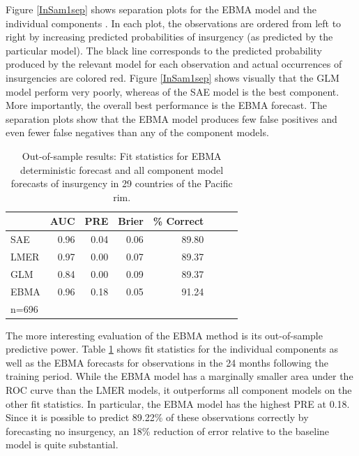 \documentclass[pdftex,12pt,fullpage,oneside]{amsart}
\begin{document}
Figure \ref{InSam1sep} shows separation plots for the EBMA model and
the individual components \citep{Greenhill:2011}. In each plot,
the observations are ordered from left to right by increasing
predicted probabilities of insurgency (as predicted by the particular
model). The black line corresponds to the predicted probability
produced by the relevant model for each observation and actual
occurrences of insurgencies are colored red.  Figure \ref{InSam1sep}
shows visually that the GLM model perform very poorly, whereas of the
SAE model is the best component.  More importantly, the overall best
performance is the EBMA forecast. The separation plots show that the
EBMA model produces few false positives and even fewer false negatives
than any of the component models.




\begin{table}
\small
\begin{center}
\caption{\footnotesize Out-of-sample results: Fit statistics for EBMA
    deterministic forecast and all component model forecasts of
    insurgency in 29 countries of the Pacific rim.}\label{OutSam1}
\begin{tabular}{l rrrrrrr}
  \toprule
 & AUC & PRE & Brier & \% Correct \\ 
  \midrule
  SAE &  0.96 & 0.04 & 0.06 & 89.80 \\ 
  LMER & 0.97 & 0.00 & 0.07 & 89.37\\ 
  GLM & 0.84 & 0.00 & 0.09 & 89.37\\ 
  EBMA & 0.96 & 0.18 & 0.05 & 91.24 \\ 
   \bottomrule
n=696 \\
\end{tabular}
\end{center}
\end{table}



The more interesting evaluation of the EBMA method is its
out-of-sample predictive power. Table \ref{OutSam1} shows fit
statistics for the individual components as well as the EBMA forecasts
for observations in the 24 months following the training period.
While the EBMA model has a marginally smaller area under the ROC curve
than the LMER models, it outperforms all component models on the other
fit statistics. In particular, the EBMA model has the highest PRE at
0.18.  Since it is possible to predict 89.22\% of these observations
correctly by forecasting no insurgency, an 18\% reduction of error
relative to the baseline model is quite substantial.
\end{document}

